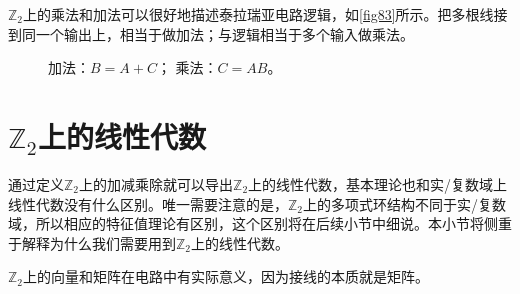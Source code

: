 $\mathbb{Z}_2$上的乘法和加法可以很好地描述泰拉瑞亚电路逻辑，如\autoref{fig83}所示。把多根线接到同一个输出上，相当于做加法；与逻辑相当于多个输入做乘法。

\begin{figure}[!htp]
	\centering
	\caption{
		\protect{}加法：$B=A+C$；
		\protect{}乘法：$C=AB$。
	}\label{fig83}
\end{figure}

\section{$\mathbb{Z}_2$上的线性代数}
通过定义$\mathbb{Z}_2$上的加减乘除就可以导出$\mathbb{Z}_2$上的线性代数，基本理论也和实/复数域上线性代数没有什么区别。唯一需要注意的是，$\mathbb{Z}_2$上的多项式环结构不同于实/复数域，所以相应的特征值理论有区别，这个区别将在后续小节中细说。本小节将侧重于解释为什么我们需要用到$\mathbb{Z}_2$上的线性代数。

$\mathbb{Z}_2$上的向量和矩阵在电路中有实际意义，因为接线的本质就是矩阵。

